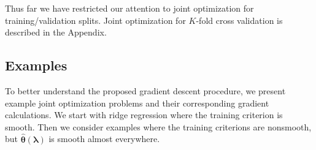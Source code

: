 \documentclass{statsoc}
\begin{document}
\begin{algorithm}
\begin{algorithmic}
	\ENDFOR
  \end{algorithmic}
\end{algorithm}

Thus far we have restricted our attention to joint optimization for training/validation splits. Joint optimization for $K$-fold cross validation is described in the Appendix.

\subsection{Examples}\label{exampleSection}

To better understand the proposed gradient descent procedure, we present example joint optimization problems and their corresponding gradient calculations. We start with ridge regression where the training criterion is smooth. Then we consider examples where the training criterions are nonsmooth, but $\hat{\boldsymbol \theta}(\boldsymbol\lambda)$ is smooth almost everywhere.
\end{document}
